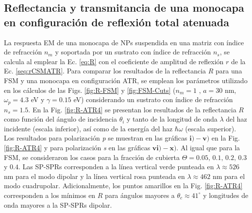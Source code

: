 	\subsection{Reflectancia y transmitancia de una monocapa en configuración de reflexión total atenuada}

La respuesta EM de una monocapa de NPs suspendida en una matriz con índice de refracción $n_m$ y soportada por un sustrato con índice de refracción $n_s$, se calcula al emplear la Ec.  \eqref{eq:R} con el coeficiente de amplitud de reflexión $r$ de la Ec.  \eqref{seq:rCSMATR}. Para comparar los resultados de la reflectancia $R$ para una FSM y una monocapa en configuración ATR, se emplean los parámetros utilizado en los cálculos de las Figs. \ref{fig:R-FSM} y \ref{fig:FSM-Cuts} ($n_m=1$ , $a=30$ nm, $\omega_p=4.3$ eV y  $\gamma = 0.15$ eV) considerando un sustrato con índice de refracción $n_s=1.5$. En la Fig.  \ref{fig:R-ATR4} se presentan los resultados de la reflectancia $R$ como función del ángulo de incidencia $\theta_i$ y tanto de la longitud de onda $\lambda$ del haz incidente (escala inferior), así como de la energía del haz $\hbar\omega$ (escala superior). Los resultados para polarización \emph{p} se muestran en las gráficas $\mathbf{i)-v)}$ en la Fig.  \ref{fig:R-ATR4} y para polarización \emph{s} en las gráficas $\mathbf{vi)-x)}$. Al igual que para la FSM, se consideraron los casos para la fracción de cubierta $\Theta = 0.05,\,0.1,\,0.2,\,0.3$ y $0.4$. Las SP-SPRs corresponden a la línea vertical verde punteada en $\lambda \approx 526$ nm para el modo dipolar y la línea vertical rosa punteada en  $\lambda \approx 462$ nm para el modo cuadrupolar. Adicionalmente, los puntos amarillos en la Fig. \ref{fig:R-ATR4} corresponden a los mínimos en $R$ para ángulos mayores a $\theta_c\approx 41^\circ$ y longitudes de onda mayores a la SP-SPRs dipolar.

